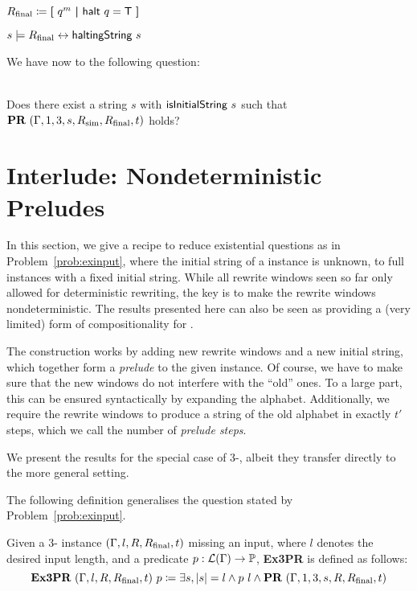 \begin{definition}
  \mnote[finalSubstrings]{$\Rfinal$}
  $R_{\text{final}} \coloneqq \textbf{[}~ q^m ~\textbf{|}~ \textsf{halt}~q = \mathsf{T} ~\textbf{]}$
\end{definition}

\begin{proposition}
  $s \models R_{\text{final}} \leftrightarrow \textsf{haltingString}~s$
\end{proposition}

We have now  \gennp{} to the following question: 
\begin{problem}\label{prob:exinput}~\\
  Does there exist a string $s$ with $\textsf{isInitialString}~s$ such that $\textbf{PR}{}~(\Gamma, 1, 3, s, R_{\text{sim}}, R_{\text{final}}, t)$ holds?
\end{problem}

\section{Interlude: Nondeterministic Preludes}\label{sec:preludes}
In this section, we give a recipe to reduce existential questions as in Problem~\ref{prob:exinput}, where the initial string of a \PR{} instance is unknown, to full \PR{} instances with a fixed initial string. 
While all rewrite windows seen so far only allowed for deterministic rewriting, the key is to make the rewrite windows nondeterministic. The results presented here can also be seen as providing a (very limited) form of compositionality for \PR{}.

The construction works by adding new rewrite windows and a new initial string, which together form a \emph{prelude} to the given \PR{} instance. 
Of course, we have to make sure that the new windows do not interfere with the ``old'' ones. To a large part, this can be ensured syntactically by expanding the alphabet. Additionally, we require the rewrite windows to produce a string of the old alphabet in exactly $t'$ steps, which we call the number of \emph{prelude steps}. 

We present the results for the special case of 3-\PR{}, albeit they transfer directly to the more general setting.

The following definition generalises the question stated by Problem~\ref{prob:exinput}.
\newcommand{\expr}{\textbf{Ex3PR}}
\begin{definition}[Existential 3-\PR{} (\expr{})][ExPTPR]
  \mnote[ExPTPR]{\expr{}}
  Given a 3-\PR{} instance $(\Gamma, l, R, R_{\text{final}}, t)$ missing an input, where $l$ denotes the desired input length, and a predicate $p : \mathcal{L} (\Gamma) \rightarrow \mathbb{P}$, \expr{} is defined as follows:
  \[\expr{}~(\Gamma, l, R, \Rfinal, t)~p \defeq \exists s, \length{s} = l \land p~l \land \PR{}~(\Gamma, 1, 3, s, R, \Rfinal, t) \]
\end{definition}

